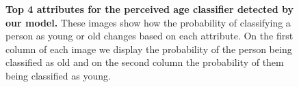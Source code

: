 \begin{figure}[H]
\centering
{}
    \hspace{0.2em}
    \hspace{0.2em}
    \hspace{0.2em}
    \caption {\textbf{Top 4 attributes for the perceived age classifier detected by our model.} These images show how the probability of classifying a person as young or old changes based on each attribute. On the first column of each image we display the probability of the person being classified as old and on the second column the probability of them being classified as young.} 
    \label{fig:top 4 attrs ours}
\end{figure}


